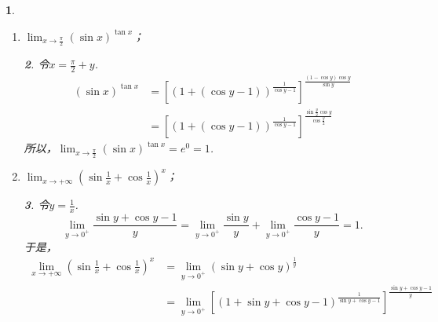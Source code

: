 \documentclass[utf8]{book}
\newtheorem{example}{}[section]             %
\newtheorem{solution}{}
\begin{document}
\begin{example}
\begin{enumerate}
\begin{solution}
利用三角函数性质：
$$\tan{2x}=\frac{\sin{2x}}{\cos{2x}}=\frac{2\sin{x}\cos{x}}{(\sin{x}+\cos{x})(\cos{x}-\sin{x})}.$$
\begin{equation*}
\begin{split}
(\tan{x})^{\tan{2x}}&=\left(1+\frac{\sin{x}-\cos{x}}{\cos{x}}\right)^{\displaystyle\frac{2\sin{x}\cos{x}}{(\sin{x}+\cos{x})(\cos{x}-\sin{x})}}\\
&=\left[\left(1+\frac{\sin{x}-\cos{x}}{\cos{x}}\right)^{\displaystyle\frac{\cos{x}}{(\sin{x}-\cos{x})}}\right]^{\displaystyle\frac{-2\sin{x}}{(\sin{x}+\cos{x})}}
\end{split}
\end{equation*}
所以，$\displaystyle\lim_{x\to \frac{\pi}{4}}\left(\tan{x}\right)^{\tan{2x}}=e^{-1}$.
\end{solution}
\item $\displaystyle\lim_{x\to \frac{\pi}{2}}\left(\sin{x}\right)^{\tan{x}}$；
\begin{solution}令$x=\frac{\pi}{2}+y$.
\begin{equation*}
\begin{split}
\left(\sin{x}\right)^{\tan{x}}&=\left[\left(1+(\cos{y} - 1)\right)^{\displaystyle\frac{1}{\cos{y} - 1}}\right]^{\displaystyle\frac{(1-\cos{y})\cos{y}}{\sin{y}}}\\
&=\left[\left(1+(\cos{y} - 1)\right)^{\displaystyle\frac{1}{\cos{y} - 1}}\right]^{\displaystyle\frac{\sin{\frac{y}{2}}\cos{y}}{\cos{\frac{y}{2}}}}
\end{split}
\end{equation*}
所以，$\displaystyle\lim_{x\to \frac{\pi}{2}}\left(\sin{x}\right)^{\tan{x}}=e^{0}=1$.
\end{solution}
\item $\displaystyle\lim_{x\to +\infty}\left(\sin{\frac{1}{x}}+\cos{\frac{1}{x}}\right)^{x}$；
\begin{solution}
令$y=\frac{1}{x}$.
$$\displaystyle\lim_{y\to 0^+}\frac{\sin{y}+\cos{y} - 1}{y}=\displaystyle\lim_{y\to 0^+}\frac{\sin{y}}{y}+\displaystyle\lim_{y\to 0^+}\frac{\cos{y} - 1}{y}= 1.$$
于是，
\begin{equation*}
\begin{split}
\displaystyle\lim_{x\to +\infty}\left(\sin{\frac{1}{x}}+\cos{\frac{1}{x}}\right)^{x}&=\displaystyle\lim_{y\to 0^+}\left(\sin{y}+\cos{y}\right)^{\frac{1}{y}}\\
&=\displaystyle\lim_{y\to 0^+}\left[(1+\sin{y}+\cos{y}-1)^{\frac{1}{\sin{y}+\cos{y}-1}}\right]^{\frac{\sin{y}+\cos{y}-1}{y}}\\

\end{split}
\end{equation*}
\end{solution}
\end{enumerate}
\end{example}
\end{document}
